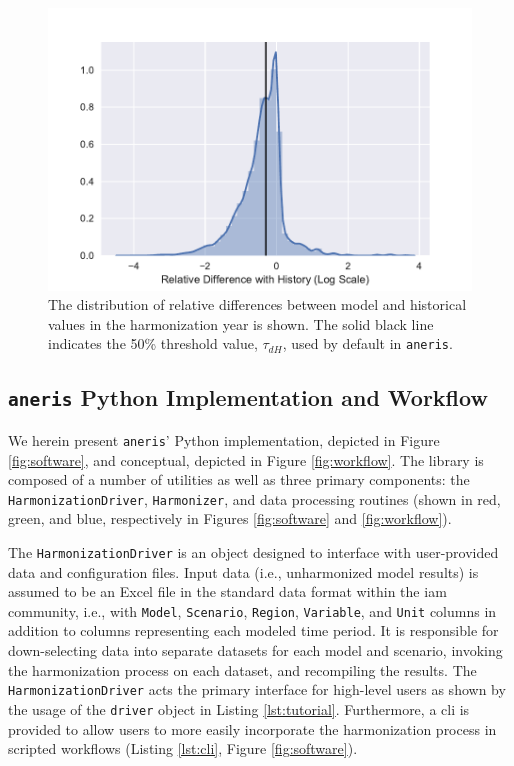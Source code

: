 \documentclass[review]{elsarticle}
\newcommand{\code}[1]{\lstinline[basicstyle=\ttfamily\color{black}]|#1|}
\begin{document}
\begin{figure}
  \begin{center}
    \includegraphics[width=\textwidth]{dh.pdf}
    \caption[]{
      \label{fig:dh}
      The distribution of relative differences between model and historical
      values in the harmonization year is shown. The solid black line indicates
      the 50\% threshold value, $\tau_{dH}$, used by default in \code{aneris}.
    }
  \end{center}
\end{figure}

\subsection{\code{aneris} Python Implementation and Workflow}\label{sec:workflow}

We herein present \code{aneris}' Python implementation, depicted in Figure
\ref{fig:software}, and conceptual, depicted in Figure \ref{fig:workflow}. The
library is composed of a number of utilities as well as three primary
components: the \texttt{HarmonizationDriver}, \texttt{Harmonizer}, and data
processing routines (shown in red, green, and blue, respectively in Figures
\ref{fig:software} and \ref{fig:workflow}).

The \texttt{HarmonizationDriver} is an object designed to interface with
user-provided data and configuration files. Input data (i.e., unharmonized model
results) is assumed to be an Excel file in the standard data format within the
\gls{iam} community, i.e., with \code{Model}, \code{Scenario}, \code{Region},
\code{Variable}, and \code{Unit} columns in addition to columns representing
each modeled time period. It is responsible for down-selecting data into
separate datasets for each model and scenario, invoking the harmonization
process on each dataset, and recompiling the results. The
\texttt{HarmonizationDriver} acts the primary interface for high-level users as
shown by the usage of the \texttt{driver} object in Listing
\ref{lst:tutorial}. Furthermore, a \gls{cli} is provided to allow users to more
easily incorporate the harmonization process in scripted workflows (Listing
\ref{lst:cli}, Figure \ref{fig:software}).
\end{document}
